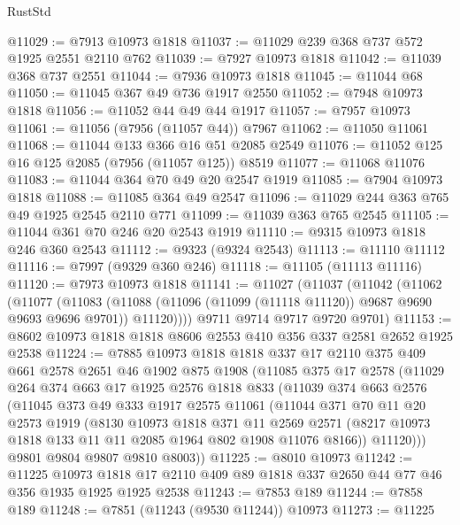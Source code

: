 \begin{lexlean}{RustStd}
\begin{coremodule}
{\begin{coremodule}
{{{{{{{{{{{{{{{{{{{{{{{{{{{{{{{{{{{{{{{{{{{@11029 := @7913 @10973 @1818
@11037 := @11029 @239 @368 @737 @572 @1925 @2551 @2110 @762
@11039 := @7927 @10973 @1818
@11042 := @11039 @368 @737 @2551
@11044 := @7936 @10973 @1818
@11045 := @11044 @68
@11050 := @11045 @367 @49 @736 @1917 @2550
@11052 := @7948 @10973 @1818
@11056 := @11052 @44 @49 @44 @1917
@11057 := @7957 @10973
@11061 := @11056 (@7956 (@11057 @44)) @7967
@11062 := @11050 @11061
@11068 := @11044 @133 @366 @16 @51 @2085 @2549
@11076 := @11052 @125 @16 @125 @2085 (@7956 (@11057 @125)) @8519
@11077 := @11068 @11076
@11083 := @11044 @364 @70 @49 @20 @2547 @1919
@11085 := @7904 @10973 @1818
@11088 := @11085 @364 @49 @2547
@11096 := @11029 @244 @363 @765 @49 @1925 @2545 @2110 @771
@11099 := @11039 @363 @765 @2545
@11105 := @11044 @361 @70 @246 @20 @2543 @1919
@11110 := @9315 @10973 @1818 @246 @360 @2543
@11112 := @9323 (@9324 @2543)
@11113 := @11110 @11112
@11116 := @7997 (@9329 @360 @246)
@11118 := @11105 (@11113 @11116)
@11120 := @7973 @10973 @1818
@11141 := @11027
    (@11037
      (@11042
        (@11062
          (@11077
            (@11083
              (@11088 (@11096 (@11099 (@11118 @11120)) @9687 @9690 @9693 @9696 @9701))
              @11120))))
      @9711
      @9714
      @9717
      @9720
      @9701)
@11153 := @8602 @10973 @1818 @1818 @8606 @2553 @410 @356 @337 @2581 @2652 @1925 @2538
@11224 := @7885
    @10973
    @1818
    @1818
    @337
    @17
    @2110
    @375
    @409
    @661
    @2578
    @2651
    @46
    @1902
    @875
    @1908
    (@11085
      @375
      @17
      @2578
      (@11029
        @264
        @374
        @663
        @17
        @1925
        @2576
        @1818
        @833
        (@11039
          @374
          @663
          @2576
          (@11045
            @373
            @49
            @333
            @1917
            @2575
            @11061
            (@11044
              @371
              @70
              @11
              @20
              @2573
              @1919
              (@8130
                @10973
                @1818
                @371
                @11
                @2569
                @2571
                (@8217 @10973 @1818 @133 @11 @11 @2085 @1964 @802 @1908 @11076 @8166))
              @11120)))
        @9801
        @9804
        @9807
        @9810
        @8003))
@11225 := @8010 @10973
@11242 := @11225
    @10973
    @1818
    @17
    @2110
    @409
    @89
    @1818
    @337
    @2650
    @44
    @77
    @46
    @356
    @1935
    @1925
    @1925
    @2538
@11243 := @7853 @189
@11244 := @7858 @189
@11248 := @7851 (@11243 (@9530 @11244)) @10973
@11273 := @11225
}}}}}}}}}}}}}}}}}}}}}}}}}}}}}}}}}}}}}}}}}}}
\end{coremodule}}
\end{coremodule}
\end{lexlean}
